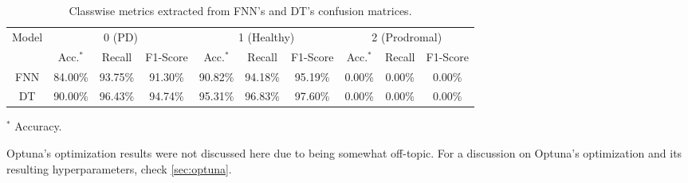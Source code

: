 \begin{table}[!hb]
    \centering
    \begin{threeparttable}
        \caption{Classwise metrics extracted from FNN's and DT's confusion matrices.}
        \label{tab:results_fnn_dt}
        \begin{tabular}{c | ccc ccc ccc}
            \toprule
            \multirow{2}{*}{Model} 
            & \multicolumn{3}{c}{0 (PD)} 
            & \multicolumn{3}{c}{1 (Healthy)} 
            & \multicolumn{3}{c}{2 (Prodromal)} \\
            & Acc.$^*$ & Recall & F1-Score
            & Acc.$^*$ & Recall & F1-Score
            & Acc.$^*$ & Recall & F1-Score \\
            \midrule
            FNN 
            & 84.00\% & 93.75\% & 91.30\%
            & 90.82\% & 94.18\% & 95.19\%
            & 0.00\% & 0.00\% & 0.00\% \\
            DT 
            & 90.00\% & 96.43\% & 94.74\%
            & 95.31\% & 96.83\% & 97.60\%
            & 0.00\% & 0.00\% & 0.00\% \\
            \bottomrule
        \end{tabular}
    \end{threeparttable}
    \begin{tablenotes}
        \item $^*$ Accuracy.
    \end{tablenotes}
\end{table}

Optuna's optimization results were not discussed here due to being somewhat off-topic.
For a discussion on Optuna's optimization and its resulting hyperparameters, check \cref{sec:optuna}.
